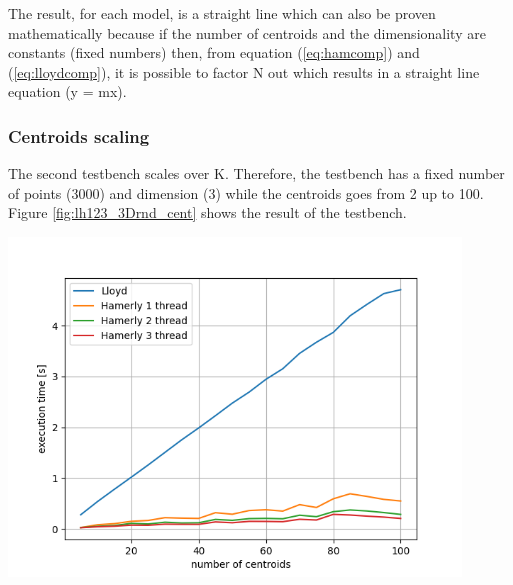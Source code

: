\documentclass{report}
\begin{document}
\begin{minipage}[b]{0.48\textwidth}
  The result, for each model, is a straight line which can also be proven mathematically because if the number of centroids and the dimensionality are constants (fixed numbers) then, from equation (\ref{eq:hamcomp}) and (\ref{eq:lloydcomp}), it is possible to factor N out which results in a straight line equation (y = mx).

  \subsubsection*{Centroids scaling}
  The second testbench scales over K. Therefore, the testbench has a fixed number of points (3000) and dimension (3) while the centroids goes from 2 up to 100. Figure \ref{fig:lh123_3Drnd_cent} shows the result of the testbench.

  \begin{center} 
    \includegraphics[width = 0.9\textwidth]{imgs/lh123_3Drnd_cent.png}
    \label{fig:lh123_3Drnd_cent}
  \end{center}

\end{minipage}
\hspace{0.1in}
\end{document}
